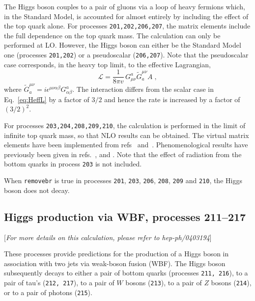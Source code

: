 \documentclass[12pt]{article}
\begin{document}
The Higgs boson couples to a pair of gluons via a loop of heavy fermions
which, in the Standard Model, is accounted for almost entirely by including
the effect of the top quark alone. For processes {\tt 201,202,206,207}, the
matrix elements include the full dependence on the top quark mass.
The calculation can only be performed at LO. 
However, the Higgs boson can either be the Standard Model one
(processes {\tt 201,202}) or a pseudoscalar ({\tt 206,207}).
Note that the pseudoscalar case corresponds, in the heavy top limit, to the effective Lagrangian,
\begin{equation}
\mathcal{L} = \frac{1}{8\pi v} \, G^a_{\mu\nu} \widetilde G^{\mu\nu}_a A \;,
\end{equation}
where $\widetilde G^{\mu\nu}_a = i\epsilon^{\mu\nu\alpha\beta}
 G_{\alpha\beta}^a$.
The interaction differs from the scalar case in Eq.~{\ref{eq:HeffL}} by a factor of $3/2$
and hence the rate is increased by a factor of $(3/2)^2$.


For processes {\tt 203,204,208,209,210}, the calculation is performed in the
limit of infinite top quark mass, so that NLO results can be obtained.
The virtual matrix elements have been implemented from
refs~\cite{Ravindran:2002dc} and~\cite{Schmidt:1997wr}.
Phenomenological results have previously been 
given in refs.~\cite{deFlorian:1999zd},\cite{Ravindran:2002dc} 
and \cite{Glosser:2002gm}.
Note that the effect of radiation from the bottom quarks in process {\tt 203}
is not included.

When {\tt removebr} is true in processes {\tt 201}, {\tt 203}, {\tt 206}, {\tt 208}, {\tt 209}
and {\tt 210}, the Higgs boson does not decay.

\subsection{Higgs production via WBF, processes 211--217}
\label{subsec:wbf}

\begin{center}
[{\it For more details on this calculation, please refer to hep-ph/0403194}]
\end{center}

These processes provide predictions for the production of a Higgs boson in
association with two jets via weak-boson fusion (WBF). The Higgs boson
subsequently decays to either a pair of bottom quarks
(processes {\tt 211, 216}), to a pair of tau's ({\tt 212, 217}), 
to a pair of $W$ bosons ({\tt 213}),
to a pair of $Z$ bosons ({\tt 214}),
or to a pair of photons ({\tt 215}).
\end{document}
